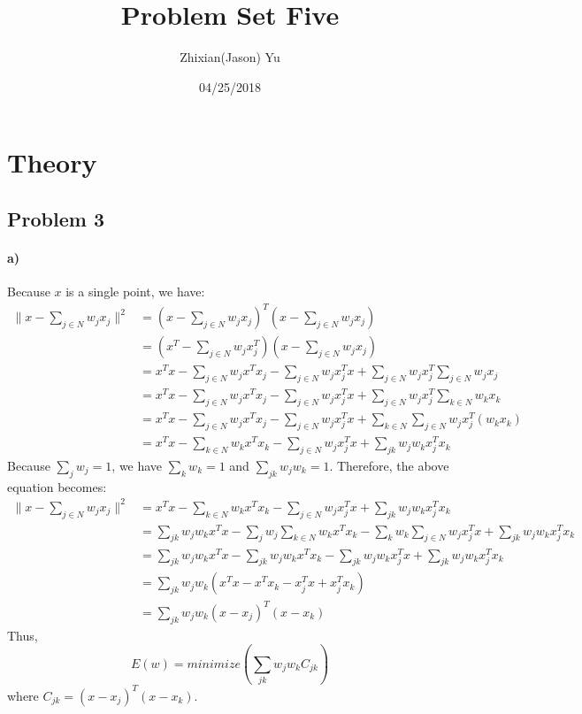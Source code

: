 \documentclass{article}
\title{Problem Set Five}
\date{04/25/2018}
\author{Zhixian(Jason) Yu}
\begin{document}
\maketitle
{}
\newpage

\section{Theory}
\subsection*{Problem 3}
\paragraph{a)} Because $x$ is a single point, we have:
\begin{align*}
\| x - \sum_{j \in N} w_j x_j \|^2 &= (x - \sum_{j \in N} w_j x_j)^T(x - \sum_{j \in N} w_j x_j) \\
&= (x^T - \sum_{j \in N} w_j x_j^T)(x - \sum_{j \in N} w_j x_j) \\
&= x^T x - \sum_{j \in N} w_j x^T x_j - \sum_{j \in N} w_j x_j^T x + \sum_{j \in N} w_j x_j^T\sum_{j \in N} w_j x_j \\
&= x^T x - \sum_{j \in N} w_j x^T x_j - \sum_{j \in N} w_j x_j^T x + \sum_{j \in N} w_j x_j^T\sum_{k \in N} w_k x_k \\
&= x^T x - \sum_{j \in N} w_j x^T x_j - \sum_{j \in N} w_j x_j^T x + \sum_{k \in N}\sum_{j \in N} w_j x_j^T (w_k x_k) \\
&= x^T x - \sum_{k \in N} w_k x^T x_k - \sum_{j \in N} w_j x_j^T x + \sum_{jk} w_j w_k x_j^T x_k
\end{align*}
Because $\sum_{j} w_j = 1$, we have $\sum_{k} w_k = 1$ and $\sum_{jk} w_j w_k = 1$. Therefore, the above equation becomes:
\begin{align*}
\| x - \sum_{j \in N} w_j x_j \|^2 &= x^T x - \sum_{k \in N} w_k x^T x_k - \sum_{j \in N} w_j x_j^T x + \sum_{jk} w_j w_k x_j^T x_k \\
&= \sum_{jk} w_j w_k x^T x - \sum_{j} w_j \sum_{k \in N} w_k x^T x_k - \sum_{k} w_k \sum_{j \in N} w_j x_j^T x + \sum_{jk} w_j w_k x_j^T x_k \\
&= \sum_{jk} w_j w_k x^T x - \sum_{jk} w_j w_k x^T x_k - \sum_{jk} w_j w_k x_j^T x + \sum_{jk} w_j w_k x_j^T x_k \\
&= \sum_{jk} w_j w_k (x^T x - x^T x_k - x_j^T x + x_j^T x_k) \\
&= \sum_{jk} w_j w_k (x-x_j)^T(x-x_k)
\end{align*}
Thus, \[ E(w) = minimize(\sum_{jk} w_j w_k C_{jk}) \] where $C_{jk} = (x-x_j)^T(x-x_k)$.
\end{document}
